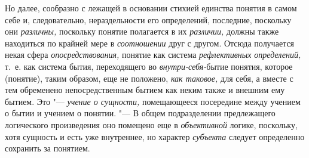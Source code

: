 Но далее, сообразно с лежащей в основании стихией единства понятия в самом
себе и, следовательно, нераздельности его определений, последние, поскольку
они {\em различны,} поскольку понятие полагается в их
{\em различии,} должны также находиться по крайней мере
в {\em соотношении} друг с другом. Отсюда получается
некая сфера {\em опосредствования,} понятие как система
{\em рефлективных определений,} т.~е. как система
бытия, переходящего во {\em внутри-себя-}бытие понятия,
которое (понятие), таким образом, еще не положено,
{\em как таковое,} для себя, а вместе с тем обременено
непосредственным бытием как неким также и внешним ему бытием. Это
"--- {\em учение о сущности,} помещающееся посередине
между учением о бытии и учением о понятии. "--- В общем подразделении
предлежащего логического произведения оно помещено еще в
{\em объективной} логике, поскольку, хотя сущность и
есть уже внутреннее, но характер {\em субъекта} следует
определенно сохранить за понятием.

